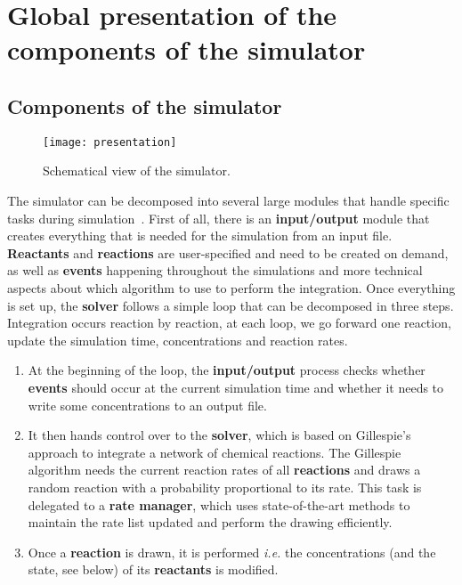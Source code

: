 \graphicspath{{\relativepath/figures/}}

\section{Global presentation of the components of the simulator}
\subsection{Components of the simulator}

\begin{figure}[!ht]
        \centering
        \texttt{[image: presentation]}
	\caption{Schematical view of the simulator.}
	\label{fig:presentation}
\end{figure}

The simulator can be decomposed into several large modules that handle specific tasks during simulation~. First of all, there is an \textbf{input/output} module that creates everything that is needed for the simulation from an input file. \textbf{Reactants} and \textbf{reactions} are user-specified and need to be created on demand, as well as \textbf{events} happening throughout the simulations and more technical aspects about which algorithm to use to perform the integration. Once everything is set up, the \textbf{solver} follows a simple loop that can be decomposed in three steps. Integration occurs reaction by reaction, at each loop, we go forward one reaction, update the simulation time, concentrations and reaction rates.

\begin{enumerate}
	\item At the beginning of the loop, the \textbf{input/output} process checks whether \textbf{events} should occur at the current simulation time and whether it needs to write some concentrations to an output file.
	\item It then hands control over to the \textbf{solver}, which is based on Gillespie's approach to integrate a network of chemical reactions. The Gillespie algorithm needs the current reaction rates of all \textbf{reactions} and draws a random reaction with a probability proportional to its rate. This task is delegated to a \textbf{rate manager}, which uses state-of-the-art methods to maintain the rate list updated and perform the drawing efficiently.
	\item Once a \textbf{reaction} is drawn, it is performed \textit{i.e.} the concentrations (and the state, see below) of its \textbf{reactants} is modified.
\end{enumerate}











